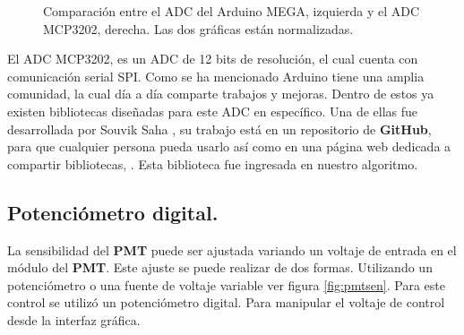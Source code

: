 \begin{figure}[h]
	\centering
	\caption{Comparación entre el ADC del Arduino MEGA, izquierda y el ADC MCP3202, derecha. Las dos gráficas están normalizadas.}
	\label{fig:ledAmari}
\end{figure}
El ADC MCP3202, es un ADC de 12 bits de resolución, el cual cuenta con comunicación serial SPI. 
Como se ha mencionado Arduino tiene una amplia comunidad, la cual día a día comparte trabajos y mejoras. Dentro de estos ya existen bibliotecas diseñadas para este ADC en específico. Una de ellas fue desarrollada por Souvik Saha \cite{MITadcLinkedIn}, su trabajo está en un repositorio de \textbf{GitHub}, \cite{MITadc} para que cualquier persona pueda usarlo así como en una página web dedicada a compartir bibliotecas, \cite{MITadcArduino}. Esta biblioteca fue ingresada en nuestro algoritmo.

\subsection{Potenciómetro digital.} 
La sensibilidad del \textbf{PMT} puede ser ajustada variando un voltaje de entrada en el módulo del \textbf{PMT}. Este ajuste se puede realizar de dos formas. Utilizando un potenciómetro o una fuente de voltaje variable ver figura \ref{fig:pmtsen}. Para este control se utilizó un potenciómetro digital. Para manipular el voltaje de control desde la interfaz gráfica.

